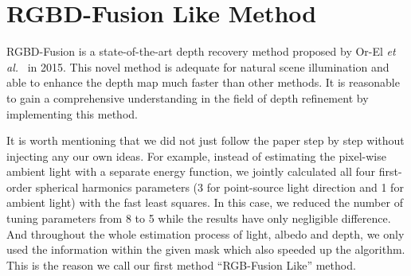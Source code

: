 \section{RGBD-Fusion Like Method}
RGBD-Fusion is a state-of-the-art depth recovery method proposed by Or-El \emph{et al.}~\cite{or2015rgbd} in 2015.
This novel method is adequate for natural scene illumination and able to enhance the depth map much faster than other methods.
It is reasonable to gain a comprehensive understanding in the field of depth refinement by implementing this method.

It is worth mentioning that we did not just follow the paper step by step without injecting any our own ideas.
For example, instead of estimating the pixel-wise ambient light with a separate energy function, we jointly calculated all four first-order spherical harmonics parameters (3 for point-source light direction and 1 for ambient light) with the fast least squares.
In this case, we reduced the number of tuning parameters from 8 to 5 while the results have only negligible difference.
And throughout the whole estimation process of light, albedo and depth, we only used the information within the given mask which also speeded up the algorithm.
This is the reason we call our first method ``RGB-Fusion Like'' method.


